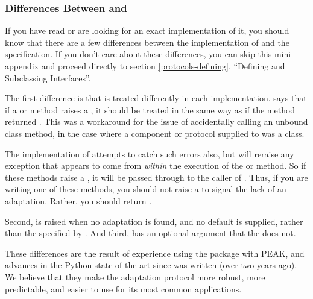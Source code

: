 \begin{verbatim%
}
\begin{verbatim%
}
\begin{seealso}
\end{seealso}


















\newpage
\subsubsection{Differences Between  and }

If you have read  or are looking for an exact implementation of it,
you should know that there are a few differences between the 
implementation of  and the  specification.  If you
don't care about these differences, you can skip this mini-appendix and
proceed directly to section \ref{protocols-defining}, ``Defining and Subclassing
Interfaces''.

The first difference is that  is treated differently in
each implementation.   says that if a  or
 method raises a , it should be
treated in the same way as if the method returned .  This was
a workaround for the issue of accidentally calling an unbound class
method, in the case where a component or protocol supplied to
 was a class.

The  implementation of  attempts to catch
such errors also, but will reraise any exception that appears to come from
\emph{within} the execution of the  or
 method.  So if these methods raise a ,
it will be passed through to the caller of .  Thus, if you
are writing one of these methods, you should not raise a 
to signal the lack of an adaptation.  Rather, you should return .

Second,  is raised when no adaptation is
found, and no default is supplied, rather than the 
specified by .  And third,  has an optional
 argument that the   does not.

These differences are the result of experience using the 
package with PEAK, and advances in the Python state-of-the-art since
 was written (over two years ago).  We believe that they make the
adaptation protocol more robust, more predictable, and easier to use for
its most common applications.







\end{verbatim%
}
\end{verbatim%
}
